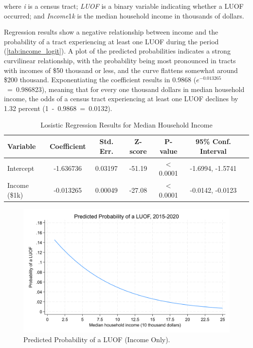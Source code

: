 \documentclass[12pt]{article}
\begin{document}
\noindent{}where \textit{i} is a census tract; \textit{LUOF} is a binary variable indicating whether a LUOF occurred; and \textit{Income}1\textit{k} is the median household income in thousands of dollars.

Regression results show a negative relationship between income and the probability of a tract experiencing at least one LUOF during the period (\autoref{tab:income_logit}). A plot of the predicted probabilities indicates a strong curvilinear relationship, with the probability being most pronounced in tracts with incomes of \$50 thousand or less, and the curve flattens somewhat around \$200 thousand. Exponentiating the coefficient results in 0.9868 ($e^{-0.013265}$~=~0.986823), meaning that for every one thousand dollars in median household income, the odds of a census tract experiencing at least one LUOF declines by 1.32 percent (1~-~0.9868~=~0.0132).

\begin{table}[h!]
\centering
\begin{tabular}{lcccccc}
\toprule
Variable & Coefficient & Std. Err. & Z-score & P-value & 95\% Conf. Interval \\
\midrule
Intercept & -1.636736 & 0.03197 & -51.19 & $<$0.0001 & -1.6994, -1.5741 \\
Income (\$1k) & -0.013265 & 0.00049 & -27.08 & $<$0.0001 & -0.0142, -0.0123 \\
\bottomrule
\end{tabular}
\caption{Losistic Regression Results for Median Household Income}
\label{tab:income_logit}
\end{table}

\begin{figure}[H]
  \centering %
  \includegraphics[width=\linewidth]{images/LUOF_logit_income_only}
  \captionsetup{justification=centering, singlelinecheck=false, margin=2cm}
  \caption[Predicted Probability of a LUOF (Income Only)]{Predicted Probability of a LUOF (Income Only).}
  \label{fig:logit_income_plot}
\end{figure}
\end{document}

